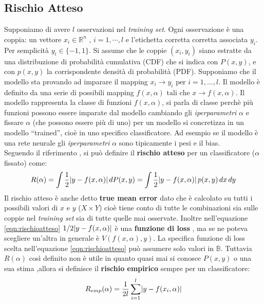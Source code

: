 \subsection{Rischio Atteso}
Supponiamo di avere $l$ osservazioni nel \textit{training set}. Ogni osservazione è una coppia: un vettore $x_{i} \in \mathbb{R}^{n} \text{ , } i=1,\cdots,l$ e l'etichetta corretta corretta associata $y_{i}$. Per semplicità $y_{i} \in \{-1,1\}$. Si assume che le coppie $(x_i,y_i)$ siano estratte da una distribuzione di probabilità cumulativa (CDF) che si indica con $P(x,y)$,  e con $p(x,y)$ la corrispondente densità di probabilità (PDF).  Supponiamo che il modello sta provando ad imparare il mapping $x_i \to y_i \text{ per } i=1,\dots,l$.  Il modello è definito da una serie di possibili mapping $f(x,\alpha) \text{ tali che } x \to f(x,\alpha) $. Il modello rappresenta la classe di funzioni $f(x,\alpha) $, si parla di classe perchè più funzioni possono essere imparate dal modello cambiando gli \textit{iperparametri} $\alpha$ e fissare $\alpha$ (che possono essere più di uno) per un modello si concretizza in un modello ``trained'', cioè in uno specifico classificatore. Ad esempio se il modello è una rete neurale gli \textit{iperparametri} $\alpha$ sono tipicamente i pesi e il bias. \\ Seguendo il riferimento \cite{Vapnik95}, si può definire il \textbf{rischio atteso} per un classificatore ($\alpha$ fissato) come:
\begin{equation}
\label{eqn:rischioatteso}
R(\alpha) = \int \frac{1}{2} \lvert y-f(x,\alpha)\rvert \, dP(x,y) = \int \frac{1}{2} \lvert y-f(x,\alpha)\rvert \, p(x,y) \, dx \, dy
\end{equation}
Il rischio atteso è anche detto \textbf{true mean error}  dato che è calcolato su tutti i possibili valori di $x$ e $y$ ($X \times Y$) cioè tiene conto di tutte le combinazioni sia sulle coppie nel \textit{training set} sia di tutte quelle mai osservate. Inoltre nell'equazione \eqref{eqn:rischioatteso}  $1/2 \lvert y-f(x,\alpha)\rvert$ è una \textbf{funzione di loss} , ma se ne poteva scegliere un'altra in generale è $V(f(x,\alpha),y)$. La specifica funzione di loss scelta nell'equazione \eqref{eqn:rischioatteso} può assumere solo valori in $\mathbb{B}$. Tuttavia $R(\alpha)$ così definito non è utile in quanto quasi mai si conosce $P(x,y)$ o una sua stima ,allora si definisce il \textbf{rischio empirico} sempre per un classificatore:
\begin{equation*}
R_{emp}(\alpha) = \frac{1}{2l} \sum_{i=1}^{l}\lvert y-f(x_{i},\alpha)\rvert
\end{equation*}
